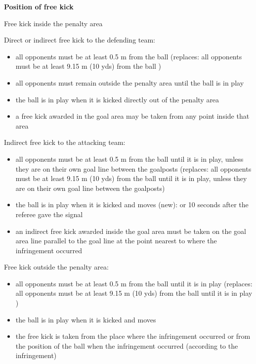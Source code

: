 \bigskip

{\bfseries Position of free kick }

\headlinebox

Free kick inside the penalty area

Direct or indirect free kick to the defending team:

\begin{itemize}
\item all opponents must be at least 0.5 m from the ball
\textcolor[rgb]{0.4,0.4,0.4}{(replaces: all opponents must be at least 9.15 m (10 yds) from the ball )}
\item all opponents must remain outside the penalty area until the ball is in play
\item the ball is in play when it is kicked directly out of the penalty area 
\item a free kick awarded in the goal area may be taken from any point inside that area
\end{itemize}

\bigskip

Indirect free kick to the attacking team:

\begin{itemize}
\item all opponents must be at least 0.5 m from the ball until it is in play, unless they are on their own goal line between the goalposts
\textcolor[rgb]{0.4,0.4,0.4}{(replaces: all opponents must be at least 9.15 m (10 yds) from the ball until it is in play, unless they are on their own goal line between the goalposts)}
\item the ball is in play when it is kicked and moves (new): or 10 seconds after the referee gave the signal
\item an indirect free kick awarded inside the goal area must be taken on the goal area line parallel to the goal line at the point nearest to where the infringement occurred
\end{itemize}

\bigskip

Free kick outside the penalty area:

\begin{itemize}
\item all opponents must be at least 0.5 m from the ball until it is in play
\textcolor[rgb]{0.4,0.4,0.4}{(replaces: all opponents must be at least 9.15 m (10 yds) from the ball until it is in play )}
\item the ball is in play when it is kicked and moves
\item the free kick is taken from the place where the infringement occurred or from the position of the ball when the infringement occurred (according to the infringement)
\end{itemize}

